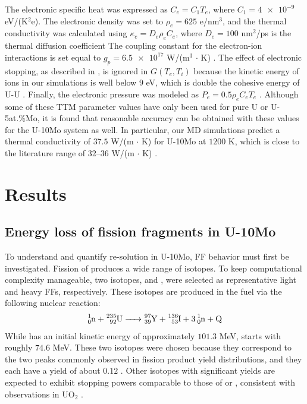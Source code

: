\documentclass[review]{elsarticle}
\newcommand{\Y}{\ce{_{39}^{97}Y}\xspace}
\newcommand{\I}{\ce{_{53}^{136}I}\xspace}
\begin{document}
The electronic specific heat was expressed as $C_e = C_1 T_e$, where $C_1 = \num{4e-9}$ eV/(K$^2$e). The electronic density was set to $\rho_e = 625$ e/nm$^3$, and the thermal conductivity was calculated using $\kappa_e = D_e \rho_e C_e$, where $D_e = 100$ nm$^2$/ps is the thermal diffusion coefficient The coupling constant for the electron-ion interactions is set equal to $g_p = \num{6.5e17}$ W/(m$^3$ $\cdot$ K) \cite{li2017, kolotova2017}. The effect of electronic stopping, as described in \cite{duffy2006, rutherford2007}, is ignored in $G (T_e, T_i)$ because the kinetic energy of ions in our simulations is well below $9$ eV, which is double the cohesive energy of U-U \cite{beeler2018disp}. Finally, the electronic pressure was modeled as $P_e = 0.5 \rho_e C_e T_e$ \cite{norman2013, pisarev2014, kolotova2017}. Although some of these TTM parameter values have only been used for pure U or U-5at.\%Mo, it is found that reasonable accuracy can be obtained with these values for the U-10Mo system as well. In particular, our MD simulations predict a thermal conductivity of $37.5$ W/(m $\cdot$ K) for U-10Mo at $1200$ K, which is close to the literature range of $32$--$36$ W/(m $\cdot$ K) \cite{burkes2010, schulthess2022}.


\section{Results}

\subsection{Energy loss of fission fragments in U-10Mo}

To understand and quantify re-solution in U-10Mo, FF behavior must first be investigated. Fission of  produces a wide range of isotopes. To keep computational complexity manageable, two isotopes, \Y and \I, were selected as representative light and heavy FFs, respectively. These isotopes are produced in the fuel via the following nuclear reaction:
\begin{align}
	\ce{
		_0^1n + _{92}^{235}U -> _{39}^{97}Y + _{53}^{136}I + 3 _0^1n + Q
	}
	\label{eq:iso}
\end{align}
While \Y has an initial kinetic energy of approximately $101.3$ MeV, \I starts with roughly $74.6$ MeV. These two isotopes were chosen because they correspond to the two peaks commonly observed in fission product yield distributions, and they each have a yield of about $0.12$ \cite{setyawan2018, mills1995}. Other isotopes with significant yields are expected to exhibit stopping powers comparable to those of \Y or \I, consistent with observations in UO$_2$ \cite{setyawan2018}.
\end{document}
